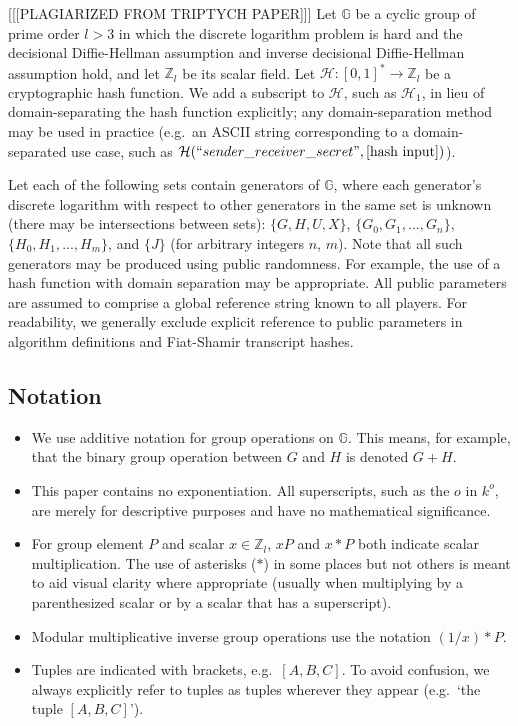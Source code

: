 [[[PLAGIARIZED FROM TRIPTYCH PAPER]]] Let $\mathbb{G}$ be a cyclic group of prime order $l > 3$ in which the discrete logarithm problem is hard and the decisional Diffie-Hellman assumption and inverse decisional Diffie-Hellman assumption hold, and let $\mathbb{Z}_l$ be its scalar field. Let $\mathcal{H}: [0,1]^* \to \mathbb{Z}_l$ be a cryptographic hash function. We add a subscript to $\mathcal{H}$, such as $\mathcal{H}_1$, in lieu of domain-separating the hash function explicitly; any domain-separation method may be used in practice (e.g.\ an ASCII string corresponding to a domain-separated use case, such as $\mathcal{H}(``sender\_receiver\_secret",[\textrm{hash input}])$).

Let each of the following sets contain generators of $\mathbb{G}$, where each generator's discrete logarithm with respect to other generators in the same set is unknown (there may be intersections between sets): $\{G, H, U, X\}$, $\{G_0, G_1,...,G_n\}$, $\{H_0, H_1,...,H_m\}$, and $\{J\}$ (for arbitrary integers $n$, $m$). Note that all such generators may be produced using public randomness. For example, the use of a hash function with domain separation may be appropriate. All public parameters are assumed to comprise a global reference string known to all players. For readability, we generally exclude explicit reference to public parameters in algorithm definitions and Fiat-Shamir transcript hashes.


\subsection{Notation}
\label{subsec:preliminaries-notation}

\begin{itemize}
    \item We use additive notation for group operations on $\mathbb{G}$. This means, for example, that the binary group operation between $G$ and $H$ is denoted $G + H$.

    \item This paper contains no exponentiation. All superscripts, such as the $o$ in $k^o$, are merely for descriptive purposes and have no mathematical significance.

    \item For group element $P$ and scalar $x \in \mathbb{Z}_l$, $x P$ and $x*P$ both indicate scalar multiplication. The use of asterisks ($*$) in some places but not others is meant to aid visual clarity where appropriate (usually when multiplying by a parenthesized scalar or by a scalar that has a superscript).

    \item Modular multiplicative inverse group operations use the notation $(1/x)*P$.

    \item Tuples are indicated with brackets, e.g.\ $[A, B, C]$. To avoid confusion, we always explicitly refer to tuples as tuples wherever they appear (e.g.\ `the tuple $[A, B, C]$').
\end{itemize}



